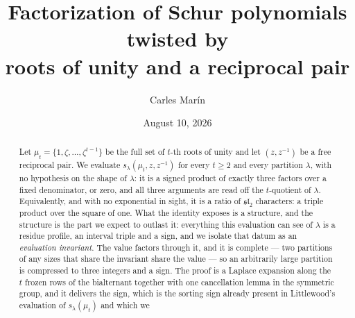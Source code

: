 \documentclass[11pt,reqno]{amsart}
\theoremstyle{plain}
\theoremstyle{definition}
\newcommand{\zt}{\mu_t}
\begin{document}
\title[Schur polynomials twisted by roots of unity and a reciprocal pair]
{Factorization of Schur polynomials twisted by\\ roots of unity and a reciprocal pair}

\author{Carles Mar\'in}
\address{Independent researcher}

\date{August 10, 2026}


\begin{abstract}
\ifdefined\LONGABS
Let $\zt=\{1,\zeta,\dots,\zeta^{t-1}\}$ be the full set of $t$-th roots of unity and let
$(z,z^{-1})$ be a free reciprocal pair. We evaluate $s_\lambda(\zt,z,z^{-1})$ for every $t\ge2$ and
every partition $\lambda$, with no hypothesis on the shape of $\lambda$: it is a signed product of
exactly three factors over a fixed denominator, or zero, and all three arguments are read off the
$t$-quotient of $\lambda$. Equivalently, and with no exponential in sight, it is a ratio of
$\mathfrak{sl}_2$ characters: a triple product over the square of one. What the identity exposes is a
structure, and the structure is the part we expect to outlast it: everything this evaluation can see
of $\lambda$ is a residue profile, an interval triple and a sign, and we isolate that datum as an
\emph{evaluation invariant}. The value factors through it, and it is complete --- two partitions of
any sizes that share the invariant share the value --- so an arbitrarily large partition is
compressed to three integers and a sign. The proof is a Laplace
expansion along the $t$ frozen rows of the
bialternant together with one cancellation lemma in the symmetric group, and it delivers the sign,
which is the sorting sign already present in Littlewood's evaluation of $s_\lambda(\zt)$ and which we

\end{abstract}
\end{document}
